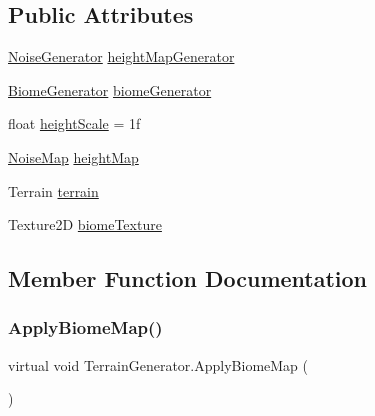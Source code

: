 \subsection*{Public Attributes}
\begin{DoxyCompactItemize}
\item 
\mbox{\hyperlink{class_noise_generator}{Noise\+Generator}} \mbox{\hyperlink{class_terrain_generator_a71c54a5bcb57410020cacf5a3ef8d490}{height\+Map\+Generator}}
\item 
\mbox{\hyperlink{class_biome_generator}{Biome\+Generator}} \mbox{\hyperlink{class_terrain_generator_ac4a6046f1aa01960502dae2faa7bbf8d}{biome\+Generator}}
\item 
float \mbox{\hyperlink{class_terrain_generator_a6439dffc9f1649c25f1439b9edf7d0ac}{height\+Scale}} = 1f
\item 
\mbox{\hyperlink{class_noise_map}{Noise\+Map}} \mbox{\hyperlink{class_terrain_generator_acc1ef38d028ff5a3bfd4288c0ae4dd1c}{height\+Map}}
\item 
Terrain \mbox{\hyperlink{class_terrain_generator_a1f609c5d9b82c0976d0efb81120516ee}{terrain}}
\item 
Texture2D \mbox{\hyperlink{class_terrain_generator_ad1cc3b94c469294950cb6a900fc8e86b}{biome\+Texture}}
\end{DoxyCompactItemize}


\subsection{Member Function Documentation}
\mbox{\label{class_terrain_generator_a8aac3ecefc24ee4f4018994ae29a1bba}} 
\subsubsection{\texorpdfstring{Apply\+Biome\+Map()}{ApplyBiomeMap()}}
{\footnotesize\ttfamily virtual void Terrain\+Generator.\+Apply\+Biome\+Map (\begin{DoxyParamCaption}{ }\end{DoxyParamCaption})\hspace{0.3cm}{\ttfamily [virtual]}}

\mbox{\label{class_terrain_generator_a9bbb5a5cfa43d7f38a8ef881b966ee26}} 
